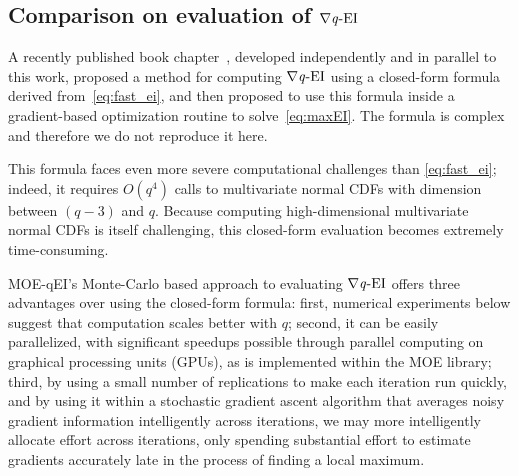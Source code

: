 \documentclass[paper=letter]{scrartcl}
\newcommand{\qEI}{\text{\textit q-EI}}
\begin{document}
\subsection{Comparison on evaluation of $\nabla \qEI$} \label{sec:compare_against_exact_eval}
A recently published book chapter~\cite{marmin2015differentiating}, developed independently and in parallel to this work, proposed a method for computing $\nabla \qEI$ using a closed-form formula derived from~\eqref{eq:fast_ei}, and then proposed to use this formula inside a gradient-based optimization routine to solve~\eqref{eq:maxEI}.
The formula is complex and therefore we do not reproduce it here.  

This formula faces even more severe computational challenges than \eqref{eq:fast_ei};
indeed, it requires $O(q^4)$ calls to multivariate normal CDFs with dimension between $(q-3)$ and $q$.  Because computing high-dimensional multivariate normal CDFs is itself challenging, 
this closed-form evaluation becomes extremely time-consuming.

MOE-qEI's Monte-Carlo based approach to evaluating $\nabla \qEI$ offers three advantages over using the closed-form formula:
first, numerical experiments below suggest that computation scales better with $q$;
second, it can be easily parallelized, with significant speedups possible through parallel computing on graphical processing units (GPUs), as is implemented within the MOE library;
third, by using a small number of replications to make each iteration run quickly, and by using it within a stochastic gradient ascent algorithm that averages noisy gradient information intelligently across iterations, we may more intelligently allocate effort across iterations, only spending substantial effort to estimate gradients accurately late in the process of finding a local maximum.

\end{document}
